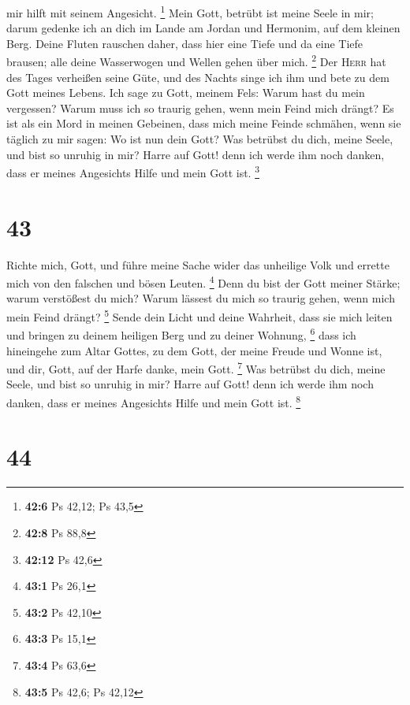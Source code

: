 mir hilft mit seinem Angesicht. \footnote{\textbf{42:6} Ps 42,12; Ps
  43,5}  Mein Gott, betrübt ist meine Seele in mir; darum
gedenke ich an dich im Lande am Jordan und Hermonim, auf dem kleinen
Berg.  Deine Fluten rauschen daher, dass hier eine Tiefe
und da eine Tiefe brausen; alle deine Wasserwogen und Wellen gehen über
mich. \footnote{\textbf{42:8} Ps 88,8}  Der \textsc{Herr}
hat des Tages verheißen seine Güte, und des Nachts singe ich ihm und
bete zu dem Gott meines Lebens.  Ich sage zu Gott, meinem
Fels: Warum hast du mein vergessen? Warum muss ich so traurig gehen,
wenn mein Feind mich drängt?  Es ist als ein Mord in
meinen Gebeinen, dass mich meine Feinde schmähen, wenn sie täglich zu
mir sagen: Wo ist nun dein Gott?  Was betrübst du dich,
meine Seele, und bist so unruhig in mir? Harre auf Gott! denn ich werde
ihm noch danken, dass er meines Angesichts Hilfe und mein Gott ist.
\footnote{\textbf{42:12} Ps 42,6}

\hypertarget{section-18}{%
\section{43}\label{section-18}}

 Richte mich, Gott, und führe meine Sache wider das
unheilige Volk und errette mich von den falschen und bösen Leuten.
\footnote{\textbf{43:1} Ps 26,1}  Denn du bist der Gott
meiner Stärke; warum verstößest du mich? Warum lässest du mich so
traurig gehen, wenn mich mein Feind drängt? \footnote{\textbf{43:2} Ps
  42,10}  Sende dein Licht und deine Wahrheit, dass sie
mich leiten und bringen zu deinem heiligen Berg und zu deiner Wohnung,
\footnote{\textbf{43:3} Ps 15,1}  dass ich hineingehe zum
Altar Gottes, zu dem Gott, der meine Freude und Wonne ist, und dir,
Gott, auf der Harfe danke, mein Gott. \footnote{\textbf{43:4} Ps 63,6}
 Was betrübst du dich, meine Seele, und bist so unruhig in
mir? Harre auf Gott! denn ich werde ihm noch danken, dass er meines
Angesichts Hilfe und mein Gott ist. \footnote{\textbf{43:5} Ps 42,6; Ps
  42,12}

\hypertarget{section-19}{%
\section{44}\label{section-19}}

